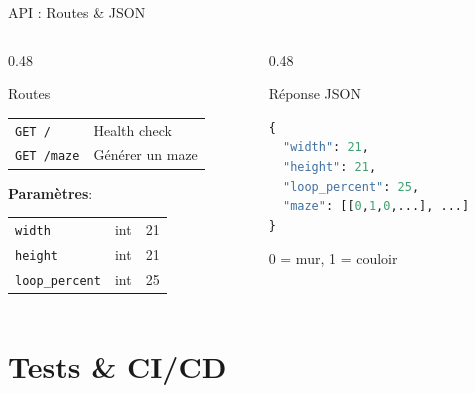 \documentclass[aspectratio=169, 12pt]{beamer}
\begin{document}
\begin{frame}[fragile]{API : Routes \& JSON}
\begin{columns}[T]
\begin{column}{0.48\textwidth}
\begin{block}{\small Routes}
\begin{tabular}{ll}
\texttt{GET /} & Health check \\
\texttt{GET /maze} & Générer un maze \\
\end{tabular}

\vspace{0.2cm}
\textbf{Paramètres}:
\begin{tabular}{lll}
\texttt{width} & int & 21 \\
\texttt{height} & int & 21 \\
\texttt{loop\_percent} & int & 25 \\
\end{tabular}
\end{block}
\end{column}

\begin{column}{0.48\textwidth}
\begin{block}{\small Réponse JSON}
\begin{lstlisting}[language=Python]
{
  "width": 21,
  "height": 21,
  "loop_percent": 25,
  "maze": [[0,1,0,...], ...]
}
\end{lstlisting}
\end{block}
\small 0 = mur, 1 = couloir
\end{column}
\end{columns}
\end{frame}

\section{Tests \& CI/CD}
\end{document}
